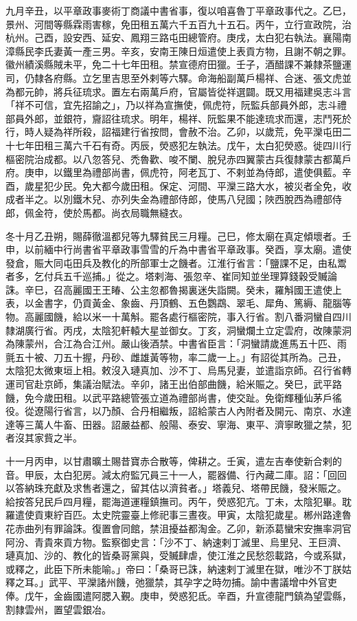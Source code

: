\begin{pinyinscope}
 九月辛丑，以平章政事麥術丁商議中書省事，復以咱喜魯丁平章政事代之。乙巳，景州、河間等縣霖雨害稼，免田租五萬六千五百九十五石。丙午，立行宣政院，治杭州。己酉，設安西、延安、鳳翔三路屯田總管府。庚戌，太白犯右執法。襄陽南漳縣民李氏妻黃一產三男。辛亥，安南王陳日烜遣使上表貢方物，且謝不朝之罪。徽州績溪縣賊未平，免二十七年田租。禁宣德府田獵。壬子，酒醋課不兼隸茶鹽運司，仍隸各府縣。立乞里吉思至外剌等六驛。命海船副萬戶楊祥、合迷、張文虎並為都元帥，將兵征琉求。置左右兩萬戶府，官屬皆從祥選闢。既又用福建吳志斗言「祥不可信，宜先招諭之」，乃以祥為宣撫使，佩虎符，阮監兵部員外郎，志斗禮部員外郎，並銀符，齎詔往琉求。明年，楊祥、阮監果不能達琉求而還，志鬥死於行，時人疑為祥所殺，詔福建行省按問，會赦不治。乙卯，以歲荒，免平灤屯田二十七年田租三萬六千石有奇。丙辰，熒惑犯左執法。戊午，太白犯熒惑。徙四川行樞密院治成都。以八忽答兒、禿魯歡、唆不闌、脫兒赤四翼蒙古兵復隸蒙古都萬戶府。庚申，以鐵里為禮部尚書，佩虎符，阿老瓦丁、不剌並為侍郎，遣使俱藍。辛酉，歲星犯少民。免大都今歲田租。保定、河間、平灤三路大水，被災者全免，收成者半之。以別鐵木兒、亦列失金為禮部侍郎，使馬八兒國；陜西脫西為禮部侍郎，佩金符，使於馬都。尚衣局職無縫衣。



 冬十月乙丑朔，賜薛徹溫都兒等九驛貧民三月糧。己巳，修太廟在真定傾壞者。壬申，以前緬中行尚書省平章政事雪雪的斤為中書省平章政事。癸酉，享太廟。遣使發倉，賑大同屯田兵及教化的所部軍士之饑者。江淮行省言：「鹽課不足，由私鬻者多，乞付兵五千巡捕。」從之。塔剌海、張忽辛、崔同知並坐理算錢穀受贓論誅。辛巳，召高麗國王王睶、公主忽都魯揭裏迷失詣闕。癸未，羅斛國王遣使上表，以金書字，仍貢黃金、象齒、丹頂鶴、五色鸚鵡、翠毛、犀角、篤縟、龍腦等物。高麗國饑，給以米一十萬斛。罷各處行樞密院，事入行省。割八番洞蠻自四川隸湖廣行省。丙戌，太陰犯軒轅大星並御女。丁亥，洞蠻爛土立定雲府，改陳蒙洞為陳蒙州，合江為合江州。嚴山後酒禁。中書省臣言：「洞蠻請歲進馬五十匹、雨氈五十被、刀五十握，丹砂、雌雄黃等物，率二歲一上。」有詔從其所為。己丑，太陰犯太微東垣上相。敕沒入璉真加、沙不丁、烏馬兒妻，並遣詣京師。召行省轉運司官赴京師，集議治賦法。辛卯，諸王出伯部曲饑，給米賑之。癸巳，武平路饑，免今歲田租。以武平路總管張立道為禮部尚書，使交趾。免衛輝種仙茅戶徭役。從遼陽行省言，以乃顏、合丹相繼叛，詔給蒙古人內附者及開元、南京、水達達等三萬人牛畜、田器。詔嚴益都、般陽、泰安、寧海、東平、濟寧畋獵之禁，犯者沒其家貲之半。



 十一月丙申，以甘肅曠土賜昔寶赤合散等，俾耕之。壬寅，遣左吉奉使新合剌的音。甲辰，太白犯房。減太府監冗員三十一人，罷器備、行內藏二庫。詔：「回回以答納珠充獻及求售者還之，留其估以濟貧者。」塔義兒、塔帶民饑，發米賑之。給按答兒民戶四月糧，罷海道運糧鎮撫司。丙午，熒惑犯亢。丁未，太陰犯畢。耽羅遣使貢東紵百匹。太史院靈臺上修祀事三晝夜。甲寅，太陰犯歲星。郴州路達魯花赤曲列有罪論誅。復置會同館，禁沮擾益都淘金。乙卯，新添葛蠻宋安撫率洞官阿汾、青貴來貢方物。監察御史言：「沙不丁、納速剌丁滅里、烏里兒、王巨濟、璉真加、沙的、教化的皆桑哥黨與，受贓肆虐，使江淮之民愁怨載路，今或系獄，或釋之，此臣下所未能喻。」帝曰：「桑哥已誅，納速剌丁滅里在獄，唯沙不丁朕姑釋之耳。」武平、平灤諸州饑，弛獵禁，其孕字之時勿捕。諭中書議增中外官吏俸。戊午，金齒國遣阿腮入覲。庚申，熒惑犯氐。辛酉，升宣德龍門鎮為望雲縣，割隸雲州，置望雲銀冶。




\end{pinyinscope}
